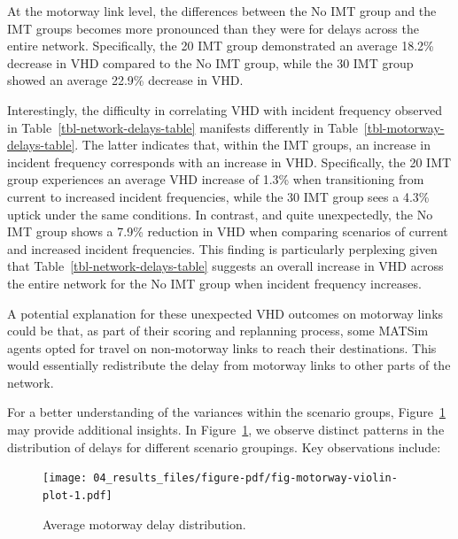 \documentclass[fancy, oneside, mastersfancy, ms]{byuthesis}
\begin{document}
At the motorway link level, the differences between the No IMT group and
the IMT groups becomes more pronounced than they were for delays across
the entire network. Specifically, the 20 IMT group demonstrated an
average 18.2\% decrease in VHD compared to the No IMT group, while the
30 IMT group showed an average 22.9\% decrease in VHD.

Interestingly, the difficulty in correlating VHD with incident frequency
observed in Table~\ref{tbl-network-delays-table} manifests differently
in Table~\ref{tbl-motorway-delays-table}. The latter indicates that,
within the IMT groups, an increase in incident frequency corresponds
with an increase in VHD. Specifically, the 20 IMT group experiences an
average VHD increase of 1.3\% when transitioning from current to
increased incident frequencies, while the 30 IMT group sees a 4.3\%
uptick under the same conditions. In contrast, and quite unexpectedly,
the No IMT group shows a 7.9\% reduction in VHD when comparing scenarios
of current and increased incident frequencies. This finding is
particularly perplexing given that Table~\ref{tbl-network-delays-table}
suggests an overall increase in VHD across the entire network for the No
IMT group when incident frequency increases.

A potential explanation for these unexpected VHD outcomes on motorway
links could be that, as part of their scoring and replanning process,
some MATSim agents opted for travel on non-motorway links to reach their
destinations. This would essentially redistribute the delay from
motorway links to other parts of the network.

For a better understanding of the variances within the scenario groups,
Figure~\ref{fig-motorway-violin-plot} may provide additional insights.
In Figure~\ref{fig-motorway-violin-plot}, we observe distinct patterns
in the distribution of delays for different scenario groupings. Key
observations include:

\begin{figure}

{\centering \texttt{[image: 04\_results\_files/figure-pdf/fig-motorway-violin-plot-1.pdf]}

}

\caption{\label{fig-motorway-violin-plot}Average motorway delay
distribution.}

\end{figure}
\end{document}
